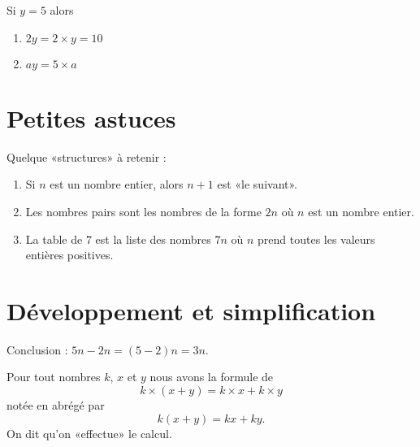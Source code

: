 \begin{example}
    Si \( y=5\) alors
    \begin{enumerate}
        \item
            \( 2y=2\times y=10\)
        \item
            \( ay=5\times a\)
    \end{enumerate}
\end{example}

\section{Petites astuces}

Quelque «structures» à retenir :
\begin{enumerate}
    \item
        Si \( n\) est un nombre entier, alors \( n+1\) est «le suivant».
    \item
        Les nombres pairs sont les nombres de la forme \( 2n\) où \( n\) est un nombre entier.
    \item
        La table de \( 7\) est la liste des nombres \( 7n\) où \( n\) prend toutes les valeurs entières positives.
\end{enumerate}

\section{Développement et simplification}



Conclusion : \( 5n-2n=(5-2)n=3n\).

\begin{Aretenir}
    Pour tout nombres \( k\), \( x\) et \( y\) nous avons la formule de 
    \begin{equation}
        k\times (x+y)=k\times x+k\times y
    \end{equation}
    notée en abrégé par
    \begin{equation}
        k(x+y)=kx+ky.
    \end{equation}
    On dit qu'on «effectue» le calcul.
\end{Aretenir}

